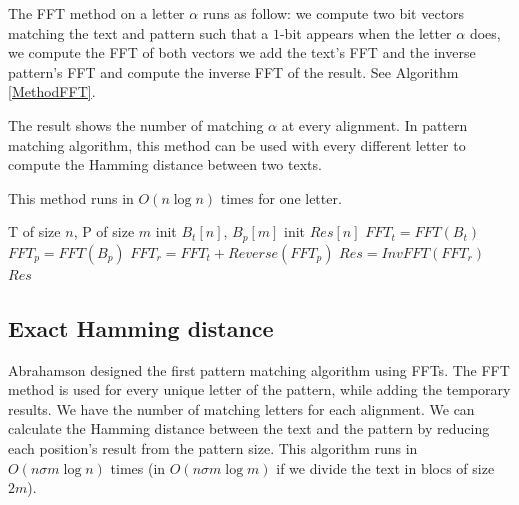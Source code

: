 \documentclass[preprint,12pt]{elsarticle}
\begin{document}
The FFT method on a letter $\alpha$ runs as follow:
we compute two bit vectors matching the text and pattern
such that a $1$-bit appears when the letter $\alpha$ does,
we compute the FFT of both vectors
we add the text's FFT and the inverse pattern's FFT
and compute the inverse FFT of the result.
See Algorithm \ref{MethodFFT}.

The result shows the number of matching $\alpha$ at every alignment.
In pattern matching algorithm, this method can be used with every different letter
to compute the Hamming distance between two texts.

This method runs in $O(n \log n)$ times for one letter.



\begin{algorithm}
\caption{$HD\_FFT(T, P, \alpha)$: }
\label{MethodFFT}
\begin{algorithmic}[1]
\REQUIRE T of size $n$, P of size $m$
\STATE init $B_t[n]$, $B_p[m]$ 
\STATE init $Res[n]$
\ENDFOR
{} 
	  
\ENDFOR
\STATE $FFT_t = FFT(B_t)$ 
\STATE $FFT_p = FFT(B_p)$
\STATE $FFT_r = FFT_t + Reverse(FFT_p)$
\STATE $Res = InvFFT(FFT_r)$ 
\RETURN $Res$

\end{algorithmic}
\end{algorithm}



\subsection{Exact Hamming distance}
\label{eHD}

Abrahamson \cite{ExactHD} designed the first pattern matching algorithm using FFTs.
The FFT method is used for every unique letter of the pattern, while adding the temporary results.
We have the number of matching letters for each alignment.
We can calculate the Hamming distance between the text and the pattern 
by reducing each position's result from the pattern size.
This algorithm runs in $O(n\sigma m \log n)$ times
(in $O(n\sigma m \log m)$ if we divide the text in blocs of size $2m$).
\end{document}
